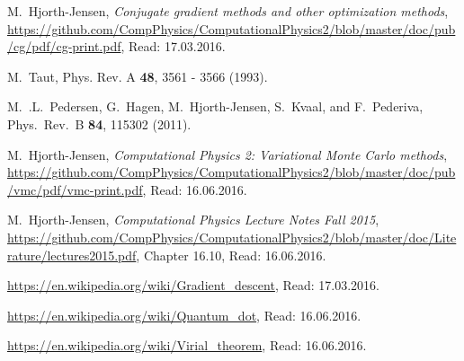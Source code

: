 \documentclass[../main.tex]{subfiles}
\begin{document}
\begin{thebibliography}{9}

 M.~Hjorth-Jensen, {\em Conjugate gradient methods and other optimization methods},  \url{https://github.com/CompPhysics/ComputationalPhysics2/blob/master/doc/pub/cg/pdf/cg-print.pdf}, Read: 17.03.2016.

 M.~Taut, Phys. Rev. A {\bf 48}, 3561 - 3566 (1993).

 M.~.L.~Pedersen, G.~Hagen, M.~Hjorth-Jensen, S.~Kvaal,  and F.~Pederiva, Phys.~Rev.~B {\bf 84}, 115302 (2011).

 M.~Hjorth-Jensen, \emph{Computational Physics 2: Variational Monte Carlo methods}, \url{https://github.com/CompPhysics/ComputationalPhysics2/blob/master/doc/pub/vmc/pdf/vmc-print.pdf}, Read: 16.06.2016.

 M.~Hjorth-Jensen, \emph{Computational Physics Lecture Notes Fall 2015},  \url{https://github.com/CompPhysics/ComputationalPhysics2/blob/master/doc/Literature/lectures2015.pdf}, Chapter 16.10, Read: 16.06.2016.

 \url{https://en.wikipedia.org/wiki/Gradient_descent}, Read: 17.03.2016.

 \url{https://en.wikipedia.org/wiki/Quantum_dot}, Read: 16.06.2016.

 \url{https://en.wikipedia.org/wiki/Virial_theorem}, Read: 16.06.2016.

\end{thebibliography}
\end{document}
